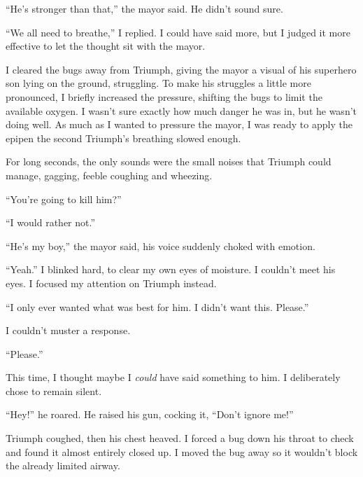 ``He's stronger than that,'' the mayor said.  He didn't sound sure.



``We all need to breathe,'' I replied.  I could have said more, but I judged it more effective to let the thought sit with the mayor.



I cleared the bugs away from Triumph, giving the mayor a visual of his superhero son lying on the ground, struggling.  To make his struggles a little more pronounced, I briefly increased the pressure, shifting the bugs to limit the available oxygen.  I wasn't sure exactly how much danger he was in, but he wasn't doing well.  As much as I wanted to pressure the mayor, I was ready to apply the epipen the second Triumph's breathing slowed enough.



For long seconds, the only sounds were the small noises that Triumph could manage, gagging, feeble coughing and wheezing.



``You're going to kill him?''



``I would rather not.''



``He's my boy,'' the mayor said, his voice suddenly choked with emotion.



``Yeah.''  I blinked hard, to clear my own eyes of moisture.  I couldn't meet his eyes.  I focused my attention on Triumph instead.



``I only ever wanted what was best for him.  I didn't want this.  Please.''



I couldn't muster a response.



``Please.''



This time, I thought maybe I \emph{could} have said something to him.  I deliberately chose to remain silent.



``Hey!'' he roared.  He raised his gun, cocking it, ``Don't ignore me!''



Triumph coughed, then his chest heaved.  I forced a bug down his throat to check and found it almost entirely closed up.  I moved the bug away so it wouldn't block the already limited airway.



